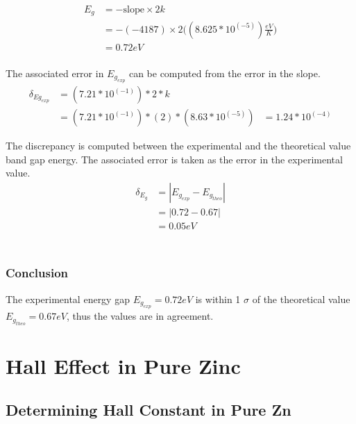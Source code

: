 \documentclass[a4paper]{article}
\begin{document}
\begin{align*}
E_g &= - \text{slope} \times 2k \\
    &= - (-4187) \times 2
       \Big(( 8.625 * 10^(-5)) \frac{eV}{K} \Big) \\
    &= 0.72 eV \\
\end{align*}

The associated error in $E_{g_{exp}}$ can be computed from the error in the slope.
\begin{align*}
\delta_{Eg_{exp}} &= {(7.21*10^(-1))*2*k} \\
                  &= (7.21*10^(-1))*(2)*(8.63*10^(-5))
                  &= 1.24*10^(-4)
\end{align*}

\qq The discrepancy is computed between the experimental and the
theoretical value band gap energy. The associated error is taken as
the error in the experimental value.
\begin{align*}
\delta_{E_g} &= | E_{g_{exp}} - E_{g_{theo}} | \\
                     &= | 0.72 - 0.67| \\
                     &= 0.05 eV \\
\end{align*}\\

\subsubsection{Conclusion}
\qq The experimental energy gap $E_{g_{exp}} = 0.72 eV$ is within
1 $\sigma$ of the theoretical value $E_{g_{theo}} = 0.67  eV$,
thus the values are in agreement.


\section{Hall Effect in Pure Zinc}

\subsection{Determining Hall Constant in Pure Zn}
\end{document}
